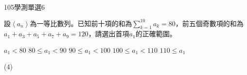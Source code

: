 \begin{QUESTIONS}
\begin{QUESTION}
        \begin{QSOLLIST}
        \end{QSOLLIST}
        \begin{QEMPTYSPACE}
        \end{QEMPTYSPACE}
    \end{QUESTION}
    \begin{QUESTION}
        \begin{ExamInfo}{105}{學測}{單選}{6}
        \end{ExamInfo}
        \begin{ExamAnsRateInfo}{28}{53}{22}{9}
        \end{ExamAnsRateInfo}
        \begin{QBODY}
            設$\left\langle {{a}_{n}} \right\rangle $為一等比數列。已知前十項的和為$\sum\limits_{k=1}^{10}{{{a}_{k}}}=80$，前五個奇數項的和為${{a}_{1}}+{{a}_{3}}+{{a}_{5}}+{{a}_{7}}+{{a}_{9}}=120$，請選出首項${{a}_{1}}$的正確範圍。
			\begin{QOPS}
				\QOP ${{a}_{1}}<80$
				\QOP $80\le {{a}_{1}}<90$
				\QOP $90\le {{a}_{1}}<100$
				\QOP $100\le {{a}_{1}}<110$
				\QOP $110\le {{a}_{1}}$
			\end{QOPS}
        \end{QBODY}
        \begin{QFROMS}
        \end{QFROMS}
        \begin{QTAGS}\end{QTAGS}
        \begin{QANS}
            (4)
        \end{QANS}
        \begin{QSOLLIST}
        \end{QSOLLIST}
        \begin{QEMPTYSPACE}
        \end{QEMPTYSPACE}
    \end{QUESTION}
\end{QUESTIONS}
